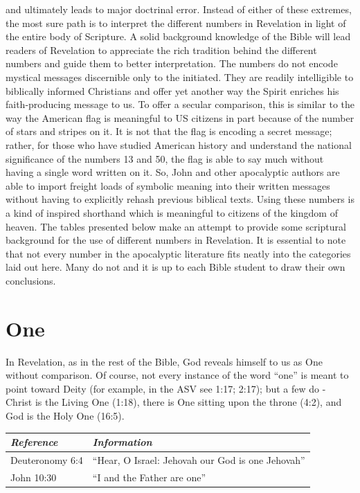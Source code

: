 and ultimately leads to major doctrinal error.
\newline\newline
Instead of either of these extremes, the most sure path is to interpret the different numbers in Revelation in light of the entire body of Scripture. A solid background knowledge of the Bible will lead readers of Revelation to appreciate the rich tradition behind the different numbers and guide them to better interpretation. The numbers do not encode mystical messages discernible only to the initiated. They are readily intelligible to biblically informed Christians and offer yet another way the Spirit enriches his faith-producing message to us. 
\newline\newline
To offer a secular comparison, this is similar to the way the American flag is meaningful to US citizens in part because of the number of stars and stripes on it. It is not that the flag is encoding a secret message; rather, for those who have studied American history and understand the national significance of the numbers 13 and 50, the flag is able to say much without having a single word written on it. So, John and other apocalyptic authors are able to import freight loads of symbolic meaning into their written messages without having to explicitly rehash previous biblical texts. Using these numbers is a kind of inspired shorthand which is meaningful to citizens of the kingdom of heaven.
\newline\newline
The tables presented below make an attempt to provide some scriptural background for the use of different numbers in Revelation. It is essential to note that not every number in the apocalyptic literature fits neatly into the categories laid out here. Many do not and it is up to each Bible student to draw their own conclusions.

\section*{One}

In Revelation, as in the rest of the Bible, God reveals himself to us as One without comparison. Of course, not every instance of the word ``one'' is meant to point toward Deity (for example, in the \textsc{ASV} see 1:17; 2:17); but a few do - Christ is the Living One (1:18), there is One sitting upon the throne (4:2), and God is the Holy One (16:5).
\newline\newline
{}
\begin{tabularx}{\textwidth}{l X}
\toprule
\rowcolor{headergray}\emph{Reference} & \emph{Information}\\ 
\midrule
Deuteronomy 6:4 & ``Hear, O Israel: Jehovah our God is one Jehovah'' \\
\addlinespace
John 10:30 & ``I and the Father are one'' \\
\bottomrule
\end{tabularx}
	
